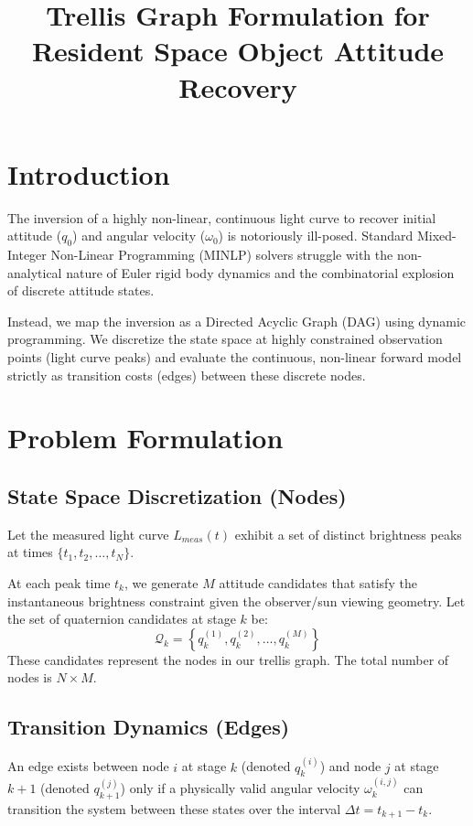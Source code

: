\documentclass{article}
\title{Trellis Graph Formulation for Resident Space Object Attitude Recovery}
\author{}
\date{}
\begin{document}
\maketitle

\section{Introduction}
The inversion of a highly non-linear, continuous light curve to recover initial attitude ($q_0$) and angular velocity ($\omega_0$) is notoriously ill-posed. Standard Mixed-Integer Non-Linear Programming (MINLP) solvers struggle with the non-analytical nature of Euler rigid body dynamics and the combinatorial explosion of discrete attitude states. 

Instead, we map the inversion as a Directed Acyclic Graph (DAG) using dynamic programming. We discretize the state space at highly constrained observation points (light curve peaks) and evaluate the continuous, non-linear forward model strictly as transition costs (edges) between these discrete nodes.

\section{Problem Formulation}

\subsection{State Space Discretization (Nodes)}
Let the measured light curve $L_{meas}(t)$ exhibit a set of distinct brightness peaks at times $\{t_1, t_2, \dots, t_N\}$. 

At each peak time $t_k$, we generate $M$ attitude candidates that satisfy the instantaneous brightness constraint given the observer/sun viewing geometry. Let the set of quaternion candidates at stage $k$ be:
\begin{equation}
    \mathcal{Q}_k = \left\{ q_{k}^{(1)}, q_{k}^{(2)}, \dots, q_{k}^{(M)} \right\}
\end{equation}
These candidates represent the nodes in our trellis graph. The total number of nodes is $N \times M$.

\subsection{Transition Dynamics (Edges)}
An edge exists between node $i$ at stage $k$ (denoted $q_k^{(i)}$) and node $j$ at stage $k+1$ (denoted $q_{k+1}^{(j)}$) only if a physically valid angular velocity $\omega_k^{(i,j)}$ can transition the system between these states over the interval $\Delta t = t_{k+1} - t_k$.
\end{document}
